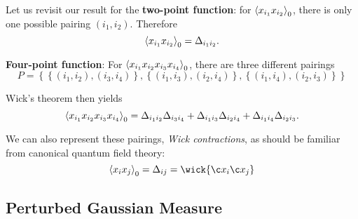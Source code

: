 \documentclass{article}
\numberwithin{equation}{section}
\begin{document}
Let us revisit our result for the \textbf{two-point function}: for $\ev{x_{i_1} x_{i_2}}_0$, there is only one possible pairing $(i_1, i_2)$. Therefore
\begin{equation}
    \ev{x_{i_1} x_{i_2}}_0 = \Delta_{i_1 i_2}.
\end{equation}

\textbf{Four-point function}: For $\ev{x_{i_1} x_{i_2} x_{i_3} x_{i_4}}_0$, there are three different pairings
\begin{equation}
    P=\left\{\left\{\left(i_1, i_2\right),\left(i_3, i_4\right)\right\},\left\{\left(i_1, i_3\right),\left(i_2, i_4\right)\right\},\left\{\left(i_1, i_4\right),\left(i_2, i_3\right)\right\}\right\}
\end{equation}

Wick's theorem then yields 
\begin{equation}
    \ev{x_{i_1} x_{i_2} x_{i_3} x_{i_4}}_0=\Delta_{i_1 i_2} \Delta_{i_3 i_4}+\Delta_{i_1 i_3} \Delta_{i_2 i_4}+\Delta_{i_1 i_4} \Delta_{i_2 i_3}.
\end{equation}

We can also represent these pairings, \textit{Wick contractions}, as should be familiar from canonical quantum field theory:
\begin{equation}
    \ev{x_i x_j}_0 = \Delta_{ij} = \wick{\c x_i \c x_j}
\end{equation}

\subsection{Perturbed Gaussian Measure}
\end{document}
